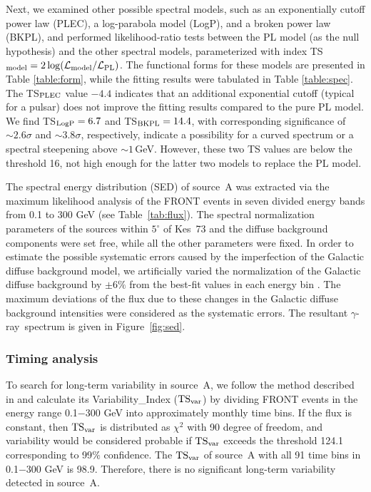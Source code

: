 \documentclass[12pt,preprint]{aastex}
\newcommand{\gray}{{\rm $\gamma$-ray}}
\begin{document}
Next, we examined other possible spectral models,
such as an exponentially cutoff power law (PLEC), 
a log-parabola model (LogP), and a broken power law (BKPL),
and performed likelihood-ratio tests between the PL model 
(as the null hypothesis) and the other spectral models,
parameterized with index TS$_{\rm model}=2\log({\mathcal L}_{\rm model}/{\mathcal L}_{\rm PL})$. 
The functional forms for these models are
presented in Table \ref{table:form},
while the fitting results were tabulated in Table \ref{table:spec}.
The TS$_{\rm PLEC}$ value $-4.4$
indicates that an additional exponential cutoff (typical for a pulsar) 
does not improve the fitting results compared to the pure PL model.
We find TS$_{\rm LogP}=6.7$ and TS$_{\rm BKPL}=14.4$, with
corresponding significance of $\sim2.6\sigma$ and  $\sim3.8\sigma$, respectively,
indicate a possibility for a curved spectrum 
or a spectral steepening above $\sim1$\,GeV.
However, these two TS values are below the threshold 16,
not high enough for the latter two models
to replace the PL model. 


The spectral energy distribution (SED) %
of source~A was extracted via the maximum likelihood analysis of the FRONT events
in seven divided energy bands from 0.1 to 300 GeV (see Table~\ref{tab:flux}). 
The spectral normalization parameters of the sources 
within $5^{\circ}$ of Kes~73 
and the diffuse background components were set free,
while all the other parameters were fixed.
In order to estimate the possible systematic errors 
caused by the imperfection of the Galactic diffuse background model,
we artificially varied the normalization of the Galactic diffuse background 
by $\pm6\%$ from the best-fit values in each energy bin \citep{Abdo2009W51C}.
The maximum deviations of the flux due to these changes in 
the Galactic diffuse background intensities 
were considered as the systematic errors.
The resultant \gray\ spectrum is given in Figure~\ref{fig:sed}.


  
\subsubsection{Timing analysis}
\label{subsec:tim}
 
To search for long-term variability in source~A,   we follow
 the method described in \citet{2fgl}  and calculate 
its Variability\_{Index} (${\rm TS}_{\rm var}$) 
by dividing  FRONT events in the energy range 0.1$-$300 GeV 
into approximately monthly time bins. 
If the flux is constant,  then ${\rm TS}_{\rm var}$ is distributed as $\chi^2$ with 90 
degree of freedom, 
and variability would be considered probable  if ${\rm TS}_{\rm var}$ exceeds
the threshold 124.1 corresponding to 99$\%$ confidence.
The ${\rm TS}_{\rm var}$ of source~A with all 91 time bins  in 0.1$-$300 GeV is 98.9. 
Therefore, there is no significant long-term variability detected in source~A.
\end{document}

